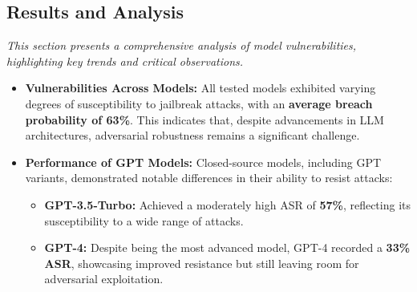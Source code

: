 \documentclass[18pt]{article}
\begin{document}
\subsection{Results and Analysis}

\textit{This section presents a comprehensive analysis of model vulnerabilities, highlighting key trends and critical observations.}

\begin{itemize}
    \item \textbf{Vulnerabilities Across Models:} All tested models exhibited varying degrees of susceptibility to jailbreak attacks, with an \textbf{average breach probability of 63\%}. This indicates that, despite advancements in LLM architectures, adversarial robustness remains a significant challenge.
    
    \item \textbf{Performance of GPT Models:} 
    Closed-source models, including GPT variants, demonstrated notable differences in their ability to resist attacks:
    \begin{itemize}
        \item \textbf{GPT-3.5-Turbo:} Achieved a moderately high ASR of \textbf{57\%}, reflecting its susceptibility to a wide range of attacks.
        \item \textbf{GPT-4:} Despite being the most advanced model, GPT-4 recorded a \textbf{33\% ASR}, showcasing improved resistance but still leaving room for adversarial exploitation.
    \end{itemize}
	

\end{itemize}
\end{document}

